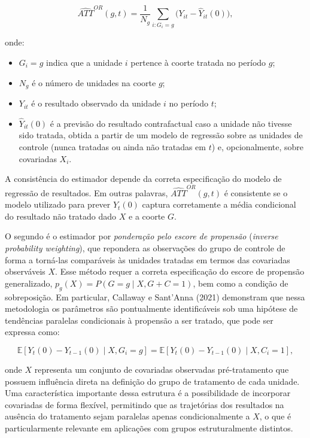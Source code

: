\documentclass[12pt,a4paper,oneside]{article}
\begin{document}
\[
\widehat{ATT}^{OR}(g,t) = \frac{1}{N_g} \sum_{i: G_i = g} \Big( Y_{it} - \hat{Y}_{it}(0) \Big),
\]

onde:
\begin{itemize}
	\item \(G_i = g\) indica que a unidade \(i\) pertence à coorte tratada no período \(g\);
	\item \(N_g\) é o número de unidades na coorte \(g\);
	\item \(Y_{it}\) é o resultado observado da unidade \(i\) no período \(t\);
	\item \(\hat{Y}_{it}(0)\) é a previsão do resultado contrafactual caso a unidade não tivesse sido tratada, obtida a partir de um modelo de regressão sobre as unidades de controle (nunca tratadas ou ainda não tratadas em \(t\)) e, opcionalmente, sobre covariadas \(X_i\).
\end{itemize}

A consistência do estimador depende da correta especificação do modelo de regressão de resultados. Em outras palavras, \(\widehat{ATT}^{OR}(g,t)\) é consistente se o modelo utilizado para prever \(Y_t(0)\) captura corretamente a média condicional do resultado não tratado dado \(X\) e a coorte \(G\).


O segundo é o estimador por \textit{ponderação pelo escore de propensão} (\textit{inverse probability weighting}), que repondera as observações do grupo de controle de forma a torná-las comparáveis às unidades tratadas em termos das covariadas observáveis \(X\). Esse método requer a correta especificação do escore de propensão generalizado, \(p_g(X) = P(G = g \mid X, G + C = 1)\), bem como a condição de sobreposição. Em particular, Callaway e Sant’Anna (2021) demonstram que nessa metodologia os parâmetros são pontualmente identificáveis sob uma hipótese de tendências paralelas condicionais à propensão a ser tratado, que pode ser expressa como:

\begin{equation}
	\mathbb{E}\left[ Y_t(0) - Y_{t-1}(0) \mid X, G_i = g \right]
	=
	\mathbb{E}\left[ Y_t(0) - Y_{t-1}(0) \mid X, C_i = 1 \right],
\end{equation}

onde $X$ representa um conjunto de covariadas observadas pré-tratamento que possuem influência direta na definição do grupo de tratamento de cada unidade. Uma característica importante dessa estrutura é a possibilidade de incorporar covariadas de forma flexível, permitindo que as trajetórias dos resultados na ausência do tratamento sejam paralelas apenas condicionalmente a $X$, o que é particularmente relevante em aplicações com grupos estruturalmente distintos.
\end{document}
